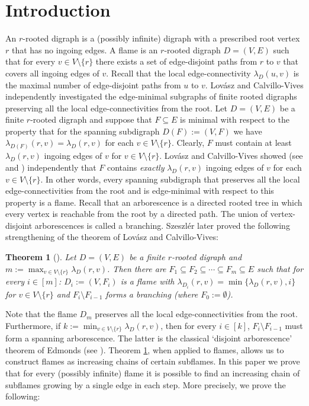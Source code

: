 \documentclass[12pt,a4paper]{amsart}
\theoremstyle{plain}
\newtheorem{theorem}{Theorem}[section]
\theoremstyle{definition}
\begin{document}
\section{Introduction}
An $r$-rooted digraph is a (possibly infinite) digraph with a prescribed root vertex $r$ that has no ingoing edges. A flame is an $r$-rooted digraph 
$D=(V,E)$ such that for every $v\in V\setminus \{ r \}$ there exists a set of edge-disjoint paths from $r$ to $v$ that covers all ingoing edges of 
$v$. 
Recall that the local edge-connectivity $\lambda_D(u,v)$ is the maximal number of edge-disjoint paths from $u$ to $v$.
Lovász and 
Calvillo-Vives  independently investigated the edge-minimal subgraphs of finite rooted digraphs preserving all the local edge-connectivities from 
the 
root.   Let $D=(V,E)$ be a finite $r$-rooted digraph and suppose that  
$F\subseteq E$ is 
minimal with respect to the property that for the spanning 
subdigraph $D(F):=(V,F)$ we have $\lambda_{D(F)}(r,v)=\lambda_D(r,v)$ for each $v\in V\setminus \{ r \}$. Clearly, $F$ must contain at least 
$\lambda_D(r,v)$ ingoing edges of $v$ for $v\in V\setminus \{ r \}$. Lovász and 
Calvillo-Vives showed (see \cite[Theorem 2]{lovasz1973connectivity} and \cite{vives1987flames}) independently that $F$ contains 
\emph{exactly} $\lambda_D(r,v)$ ingoing edges of $v$ for each $v\in V\setminus \{ r \}$. In other 
words, every  spanning subdigraph that preserves all the local edge-connectivities from the root and is edge-minimal with respect to this property is 
a 
flame. Recall that an 
 arborescence is a directed rooted tree in which every vertex is reachable  from the root by a directed path. The union of vertex-disjoint 
 arborescences is called a branching. Szeszlér later proved 
the following strengthening of the theorem of Lovász and Calvillo-Vives:
\begin{theorem}[{\cite[Theorem 8]{szeszler2025some}}]\label{thm: szesz}
 Let $D=(V,E)$ be a finite $r$-rooted digraph and $m:=\max_{v\in V\setminus \{ r \}}\lambda_D(r,v)$. Then there are 
 $F_1 \subseteq F_2 \subseteq \cdots \subseteq F_m\subseteq E$ such that for every $i\in [m]$:  $D_i:=(V,F_i)$ is a flame with 
 $\lambda_{D_i}(r,v)=\min \{ 
 \lambda_{D}(r,v), i \}$ for $v\in V\setminus \{ r \}$
 and $F_{i}\setminus F_{i-1}$ forms a branching (where $F_0:=\emptyset$).
\end{theorem}
\noindent Note that the flame $D_m$ preserves all the local edge-connectivities from the root. Furthermore, if 
$k:=\min_{v\in 
 V\setminus \{ r 
\}}\lambda_D(r,v)$, then for every $i\in [k]$,  $F_{i}\setminus F_{i-1}$ must form a spanning arborescence. The latter is the classical 
`disjoint arborescence' theorem of Edmonds (see \cite{edmonds1973edge}). Theorem \ref{thm: szesz}, when applied to flames, allows us to 
construct flames as increasing chains of certain subflames. In this paper we prove that for every (possibly infinite) flame it is possible to find an 
increasing 
chain of 
subflames growing by a single edge in each step. More precisely, we prove the following:
\end{document}
